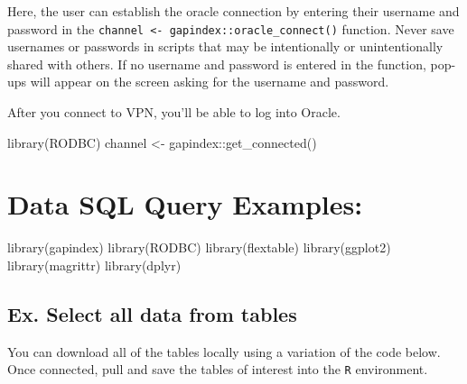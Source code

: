 \documentclass[
  letterpaper,
  oneside,
  open=any]{scrbook}
\newenvironment{Shaded}{\begin{snugshade}}{\end{snugshade}}
\newcommand{\FunctionTok}[1]{\textcolor[rgb]{0.28,0.35,0.67}{#1}}
\newcommand{\NormalTok}[1]{\textcolor[rgb]{0.00,0.23,0.31}{#1}}
\newcommand{\OtherTok}[1]{\textcolor[rgb]{0.00,0.23,0.31}{#1}}
\newcommand{\SpecialCharTok}[1]{\textcolor[rgb]{0.37,0.37,0.37}{#1}}
\begin{document}
Here, the user can establish the oracle connection by entering their
username and password in the
\texttt{channel\ \textless{}-\ gapindex::oracle\_connect()} function.
Never save usernames or passwords in scripts that may be intentionally
or unintentionally shared with others. If no username and password is
entered in the function, pop-ups will appear on the screen asking for
the username and password.

After you connect to VPN, you'll be able to log into Oracle.

\begin{Shaded}
\begin{Highlighting}[]
\FunctionTok{library}\NormalTok{(RODBC)}
\NormalTok{channel }\OtherTok{\textless{}{-}}\NormalTok{ gapindex}\SpecialCharTok{::}\FunctionTok{get\_connected}\NormalTok{()}
\end{Highlighting}
\end{Shaded}

\section*{Data SQL Query Examples:}\label{data-sql-query-examples}


\begin{Shaded}
\begin{Highlighting}[]
\FunctionTok{library}\NormalTok{(gapindex)}
\FunctionTok{library}\NormalTok{(RODBC)}
\FunctionTok{library}\NormalTok{(flextable)}
\FunctionTok{library}\NormalTok{(ggplot2)}
\FunctionTok{library}\NormalTok{(magrittr)}
\FunctionTok{library}\NormalTok{(dplyr)}
\end{Highlighting}
\end{Shaded}

\subsection{Ex. Select all data from
tables}\label{ex.-select-all-data-from-tables}

You can download all of the tables locally using a variation of the code
below. Once connected, pull and save the tables of interest into the
\texttt{R} environment.
\end{document}
